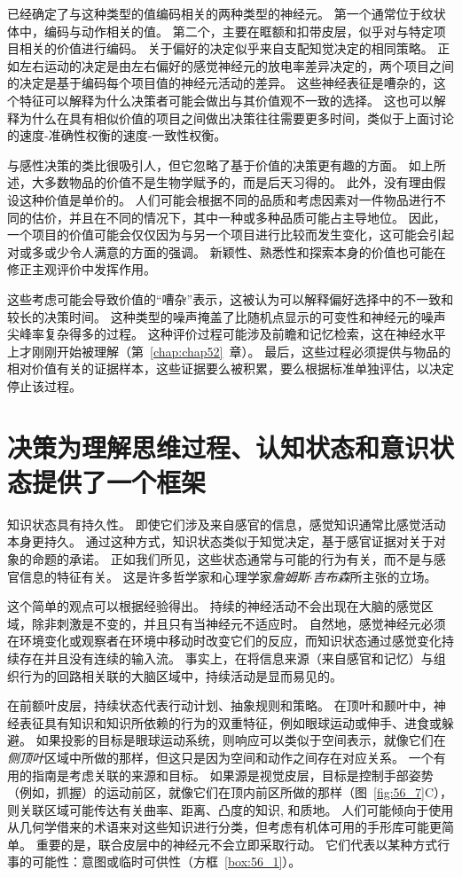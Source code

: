 已经确定了与这种类型的值编码相关的两种类型的神经元。
第一个通常位于纹状体中，编码与动作相关的值。
第二个，主要在眶额和扣带皮层，似乎对与特定项目相关的价值进行编码。
关于偏好的决定似乎来自支配知觉决定的相同策略。
正如左右运动的决定是由左右偏好的感觉神经元的放电率差异决定的，两个项目之间的决定是基于编码每个项目值的神经元活动的差异。
这些神经表征是嘈杂的，这个特征可以解释为什么决策者可能会做出与其价值观不一致的选择。
这也可以解释为什么在具有相似价值的项目之间做出决策往往需要更多时间，类似于上面讨论的速度-准确性权衡的速度-一致性权衡。


与感性决策的类比很吸引人，但它忽略了基于价值的决策更有趣的方面。
如上所述，大多数物品的价值不是生物学赋予的，而是后天习得的。
此外，没有理由假设这种价值是单价的。
人们可能会根据不同的品质和考虑因素对一件物品进行不同的估价，并且在不同的情况下，其中一种或多种品质可能占主导地位。
因此，一个项目的价值可能会仅仅因为与另一个项目进行比较而发生变化，这可能会引起对或多或少令人满意的方面的强调。
新颖性、熟悉性和探索本身的价值也可能在修正主观评价中发挥作用。


这些考虑可能会导致价值的“嘈杂”表示，这被认为可以解释偏好选择中的不一致和较长的决策时间。
这种类型的噪声掩盖了比随机点显示的可变性和神经元的噪声尖峰率复杂得多的过程。
这种评价过程可能涉及前瞻和记忆检索，这在神经水平上才刚刚开始被理解（第~\ref{chap:chap52}~章）。
最后，这些过程必须提供与物品的相对价值有关的证据样本，这些证据要么被积累，要么根据标准单独评估，以决定停止该过程。



\section{决策为理解思维过程、认知状态和意识状态提供了一个框架}

知识状态具有持久性。 即使它们涉及来自感官的信息，感觉知识通常比感觉活动本身更持久。
通过这种方式，知识状态类似于知觉决定，基于感官证据对关于对象的命题的承诺。
正如我们所见，这些状态通常与可能的行为有关，而不是与感官信息的特征有关。
这是许多哲学家和心理学家\textit{詹姆斯$\cdot$吉布森}所主张的立场。


这个简单的观点可以根据经验得出。
持续的神经活动不会出现在大脑的感觉区域，除非刺激是不变的，并且只有当神经元不适应时。
自然地，感觉神经元必须在环境变化或观察者在环境中移动时改变它们的反应，而知识状态通过感觉变化持续存在并且没有连续的输入流。
事实上，在将信息来源（来自感官和记忆）与组织行为的回路相关联的大脑区域中，持续活动是显而易见的。


在前额叶皮层，持续状态代表行动计划、抽象规则和策略。
在顶叶和颞叶中，神经表征具有知识和知识所依赖的行为的双重特征，例如眼球运动或伸手、进食或躲避。
如果投影的目标是眼球运动系统，则响应可以类似于空间表示，就像它们在\textit{侧顶叶}区域中所做的那样，但这只是因为空间和动作之间存在对应关系。
一个有用的指南是考虑关联的来源和目标。
如果源是视觉皮层，目标是控制手部姿势（例如，抓握）的运动前区，就像它们在顶内前区所做的那样（图~\ref{fig:56_7}C），则关联区域可能传达有关曲率、距离、凸度的知识, 和质地。
人们可能倾向于使用从几何学借来的术语来对这些知识进行分类，但考虑有机体可用的手形库可能更简单。
重要的是，联合皮层中的神经元不会立即采取行动。
它们代表以某种方式行事的可能性：意图或临时可供性（方框~\ref{box:56_1}）。


